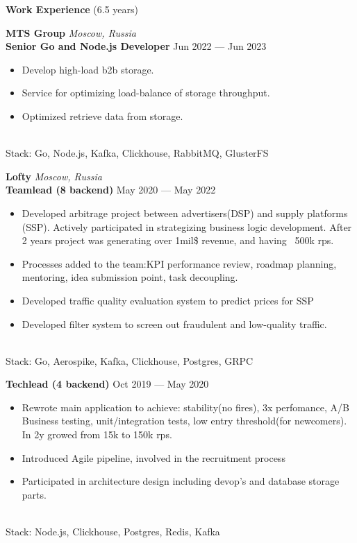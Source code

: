 \documentclass{resume} %
\begin{document}
\begin{rSection}{\textbf{Work Experience} (6.5 years) }

\textbf{MTS Group} \hfill \textit{Moscow, Russia} \\
\textbf{Senior Go and Node.js Developer}  \hfill Jun 2022 --- Jun 2023
\begin{itemize}
    \setlength\itemsep{-0.4em}
    \item Develop high-load b2b storage.
    \item Service for optimizing load-balance of storage throughput.
    \item Optimized retrieve data from storage.
\end{itemize}
\\Stack: Go, Node.js, Kafka, Clickhouse, RabbitMQ, GlusterFS

\textbf{Lofty} \hfill \textit{Moscow, Russia} \\
\textbf{Teamlead (8 backend)} \hfill May 2020 --- May 2022
\begin{itemize}
    \setlength\itemsep{-0.4em}
    \item Developed arbitrage project between advertisers(DSP) and supply platforms (SSP). Actively participated in strategizing
    	   business logic development.
    	   After 2 years project was generating over 1mil\$ revenue, and having ~500k rps.
    \item Processes added to the team:KPI performance review, roadmap planning, mentoring, idea submission point, task decoupling.
    \item Developed traffic quality evaluation system to predict prices for SSP
    \item Developed filter system to screen out fraudulent and low-quality traffic.
\end{itemize}
\\Stack: Go, Aerospike, Kafka, Clickhouse, Postgres, GRPC

\textbf{Techlead (4 backend)} \hfill Oct 2019 --- May 2020
\begin{itemize}
    \setlength\itemsep{-0.4em}
    \item Rewrote main application to achieve: stability(no fires), 3x perfomance, A/B Business testing, unit/integration tests, low
    	    entry threshold(for newcomers).
    	    In 2y growed from 15k to 150k rps.
    \item Introduced Agile pipeline, involved in the recruitment process
    \item Participated in architecture design including devop's and database storage parts.
\end{itemize}
\\Stack: Node.js, Clickhouse, Postgres, Redis, Kafka


\end{rSection}
\end{document}
